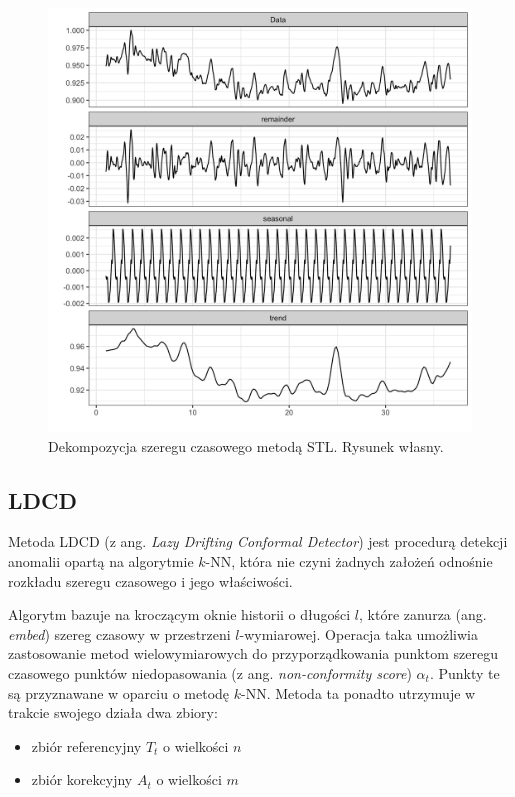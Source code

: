 \documentclass{article}
\begin{document}
\begin{figure}
\centering
\includegraphics[width=\textwidth]{./images/stl-usage.png}
\caption{Dekompozycja szeregu czasowego metodą STL. Rysunek własny.}
\end{figure}

\subsection{LDCD}

Metoda LDCD  (z ang. \emph{Lazy Drifting Conformal Detector}) \cite{knn} jest procedurą detekcji anomalii opartą
na algorytmie $k$-NN, która nie czyni żadnych założeń odnośnie rozkładu szeregu czasowego i jego właściwości.

Algorytm bazuje na kroczącym oknie historii o długości $l$, które zanurza (ang. \emph{embed}) szereg czasowy w przestrzeni $l$-wymiarowej.
Operacja taka umożliwia zastosowanie metod wielowymiarowych do przyporządkowania punktom szeregu czasowego punktów niedopasowania (z ang. \emph{non-conformity score}) $\alpha_{t}$. Punkty te są przyznawane w oparciu o metodę $k$-NN. 
Metoda ta ponadto utrzymuje w trakcie swojego działa dwa zbiory:

\begin{itemize}

  \item zbiór referencyjny $T_{t}$ o wielkości $n$
  \item zbiór korekcyjny $A_{t}$ o wielkości $m$ 

\end{itemize}
\end{document}
